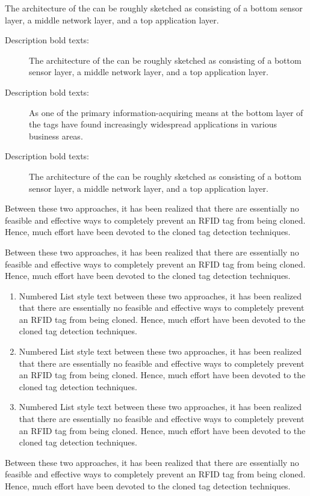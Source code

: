 \documentclass[10pt]{ietbook}
\begin{document}
The architecture of the can be roughly sketched
as consisting of a bottom sensor layer, a middle network layer, and a
top application layer.
\begin{description}
\item [Description bold texts:] The architecture of the can be roughly sketched as consisting of a bottom sensor layer, a middle network layer, and a top application layer. 
\item [Description bold texts:] As one of the primary information-acquiring means at the bottom layer of the tags have found increasingly widespread applications in various business areas.
\item [Description bold texts:] The architecture of the can be roughly sketched as consisting of a bottom sensor layer, a middle network layer, and a top application layer.
\end{description}
Between these two approaches,
it has been realized that there are essentially no feasible and
effective ways to completely prevent an RFID tag from being cloned.
Hence, much effort have been devoted to the cloned tag detection
techniques.

Between these two approaches,
it has been realized that there are essentially no feasible and
effective ways to completely prevent an RFID tag from being cloned.
Hence, much effort have been devoted to the cloned tag detection
techniques. 
\begin{enumerate}
\item{} Numbered List style text between these two approaches,
it has been realized that there are essentially no feasible and
effective ways to completely prevent an RFID tag from being cloned.
Hence, much effort have been devoted to the cloned tag detection
techniques. 
\item{} Numbered List style text between these two approaches,
it has been realized that there are essentially no feasible and
effective ways to completely prevent an RFID tag from being cloned.
Hence, much effort have been devoted to the cloned tag detection
techniques. 
\item{} Numbered List style text between these two approaches,
it has been realized that there are essentially no feasible and
effective ways to completely prevent an RFID tag from being cloned.
Hence, much effort have been devoted to the cloned tag detection
techniques. 
\end{enumerate}
Between these two approaches, it has been realized that there are essentially no feasible and
effective ways to completely prevent an RFID tag from being cloned.
Hence, much effort have been devoted to the cloned tag detection
techniques. 
\end{document}
